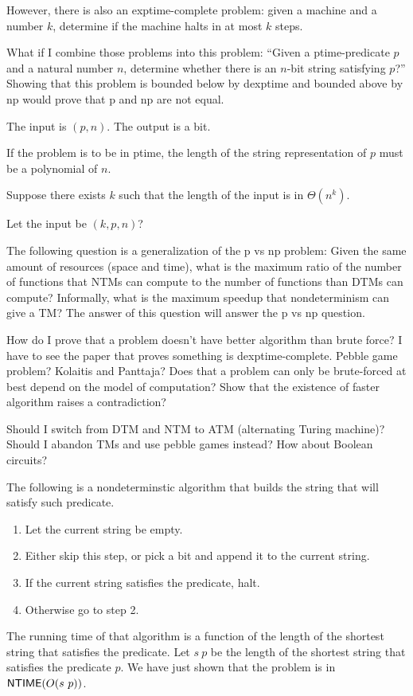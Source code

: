 However, there is also an exptime-complete problem:
given a machine and a number $k$, determine if the machine
halts in at most $k$ steps.

What if I combine those problems into this problem:
``Given a ptime-predicate $p$ and a natural number $n$,
determine whether there is an $n$-bit string satisfying $p$?''
Showing that this problem is bounded below by dexptime
and bounded above by np would prove that p and np are not equal.

The input is $(p,n)$.
The output is a bit.

If the problem is to be in ptime,
the length of the string representation of $p$
must be a polynomial of $n$.

Suppose there exists $k$ such that the length of the input is in $\Theta(n^k)$.

Let the input be $(k,p,n)$?

The following question is a generalization of the p vs np problem:
Given the same amount of resources (space and time),
what is the maximum ratio of the number of functions that NTMs can compute
to the number of functions than DTMs can compute?
Informally, what is the maximum speedup
that nondeterminism can give a TM?
The answer of this question will answer the p vs np question.

How do I prove that a problem doesn't have better algorithm than brute force?
I have to see the paper that proves something is dexptime-complete.
Pebble game problem? Kolaitis and Panttaja?
Does that a problem can only be brute-forced at best
depend on the model of computation?
Show that the existence of faster algorithm raises a contradiction?

Should I switch from DTM and NTM to ATM (alternating Turing machine)?
Should I abandon TMs and use pebble games instead?
How about Boolean circuits?

The following is a nondeterminstic algorithm that
builds the string that will satisfy such predicate.
\begin{enumerate}
\item Let the current string be empty.
\item Either skip this step,
or pick a bit and append it to the current string.
\item If the current string satisfies the predicate, halt.
\item Otherwise go to step 2.
\end{enumerate}
The running time of that algorithm is a function of the length
of the shortest string that satisfies the predicate.
Let $s~p$ be the length of the shortest string that satisfies the predicate $p$.
We have just shown that the problem is in $\operatorname{\mathsf{NTIME}}(O(s~p))$.

